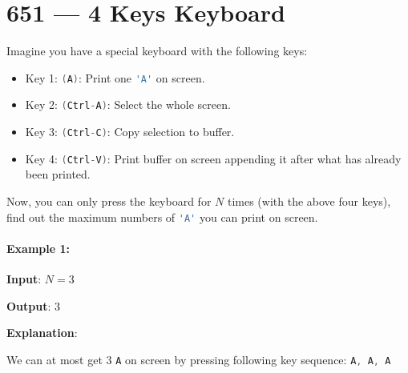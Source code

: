 \section{651 --- 4 Keys Keyboard}
Imagine you have a special keyboard with the following keys:

\begin{itemize}
\item Key 1: \lstinline[language=Java, basicstyle=\small\ttfamily, keywordstyle=\bfseries\color{green!40!black}]|(A)|: Print one \lstinline[language=Java, basicstyle=\small\ttfamily, keywordstyle=\bfseries\color{green!40!black}]|'A'| on screen.

\item Key 2: \lstinline[language=Java, basicstyle=\small\ttfamily, keywordstyle=\bfseries\color{green!40!black}]|(Ctrl-A)|: Select the whole screen.

\item Key 3: \lstinline[language=Java, basicstyle=\small\ttfamily, keywordstyle=\bfseries\color{green!40!black}]|(Ctrl-C)|: Copy selection to buffer.

\item Key 4: \lstinline[language=Java, basicstyle=\small\ttfamily, keywordstyle=\bfseries\color{green!40!black}]|(Ctrl-V)|: Print buffer on screen appending it after what has already been printed.
\end{itemize}

Now, you can only press the keyboard for $N$ times (with the above four keys), find out the maximum numbers of \lstinline[language=Java, basicstyle=\small\ttfamily, keywordstyle=\bfseries\color{green!40!black}]|'A'| you can print on screen.

\paragraph{Example 1:}

\begin{flushleft}
\textbf{Input}: $N = 3$

\textbf{Output}: 3

\textbf{Explanation}: 

We can at most get 3 \lstinline[language=Java, basicstyle=\small\ttfamily, keywordstyle=\bfseries\color{green!40!black}]|A| on screen by pressing following key sequence: \lstinline[language=Java, basicstyle=\small\ttfamily, keywordstyle=\bfseries\color{green!40!black}]|A, A, A|
\end{flushleft}

